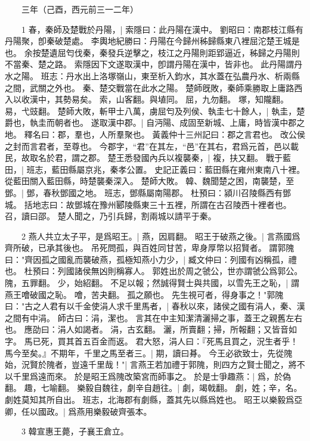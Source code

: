 　　三年（己酉，西元前三一二年）

　　1 春，秦師及楚戰於丹陽，|{
	索隱曰：此丹陽在漢中。
	劉昭曰：南郡枝江縣有丹陽聚，卽秦破楚處。
	李輿地紀勝曰：丹陽在今歸州秭歸縣東八裡屈沱楚王城是也。
	余按楚遺屈匄伐秦，秦發兵逆擊之，枝江之丹陽則距郢逼近，秭歸之丹陽則不當秦、楚之路。
	索隱因下文遂取漢中，卽謂丹陽在漢中，皆非也。
	此丹陽謂丹水之陽。
	班志：丹水出上洛塚嶺山，東至析入鈞水，其水蓋在弘農丹水、析兩縣之間，武關之外也。
	秦、楚交戰當在此水之陽。
	楚師旣敗，秦師乘勝取上庸路西入以收漢中，其勢易矣。
	索，山客翻。與埴同。
	屈，九勿翻。
	塚，知隴翻。
	易，弋豉翻。
}
楚師大敗，斬甲士八萬，虜屈匄及列侯、執圭七十餘人，|{
	執圭，楚爵也，執圭而朝者也。
}
遂取漢中郡。|{
	自沔陽、成固至新城、上庸，時皆漢中郡之地。
	釋名曰：郡，羣也，人所羣聚也。
	黃義仲十三州記曰：郡之言君也。
	改公侯之封而言君者，至尊也。
	今郡字，“君”在其左，“邑”在其右，君爲元首，邑以載民，故取名於君，謂之郡。
}
楚王悉發國內兵以複襲秦，|{
	複，扶又翻。
}
戰于藍田，|{
	班志，藍田縣屬京兆，秦孝公置。
	史記正義曰：藍田縣在雍州東南八十裡。
	從藍田關入藍田縣，時楚襲秦深入。
}
楚師大敗。
	韓、魏聞楚之困，南襲楚，至鄧。|{
	鄧，春秋鄧國之地。
	班志，鄧縣屬南陽郡。
	杜預曰：潁川召陵縣西有鄧城。
	括地志曰：故鄧城在豫州郾陵縣東三十五裡，所謂在古召陵西十裡者也。
	召，讀曰邵。
}
楚人聞之，乃引兵歸，割兩城以請平于秦。


　　2 燕人共立太子平，是爲昭王。|{
	燕，因肩翻。
}
昭王于破燕之後。|{
	言燕國爲齊所破，已承其後也。
}
吊死問孤，與百姓同甘苦，卑身厚幣以招賢者。
	謂郭隗曰："齊因孤之國亂而襲破燕，孤極知燕小力少，|{
	臧文仲曰：列國有凶稱孤，禮也。
	杜預曰：列國諸侯無凶則稱寡人。
	郭姓出於周之虢公，世亦謂虢公爲郭公。
	隗，五罪翻。
	少，始紹翻。
}
不足以報；然誠得賢士與共國，以雪先王之恥，|{
	謂燕王噲破國之恥。
	噲，苦夬翻。
}
孤之願也。
	先生視可者，得身事之！"郭隗曰："古之人君有以千金使涓人求千里馬者，|{
	春秋以來，諸侯之國有涓人，秦、漢之間有中涓。
	師古曰：涓，潔也。
	言其在中主知潔清灑掃之事，蓋王之親舊左右也。
	應劭曰：涓人如謁者。
	涓，古玄翻。
	灑，所賣翻；掃，所報翻；又皆音如字。
}
馬已死，買其首五百金而返。
	君大怒，涓人曰：『死馬且買之，況生者乎！馬今至矣。』不期年，千里之馬至者三。|{
	期，讀曰朞。
}
今王必欲致士，先從隗始，況賢於隗者，豈遠千里哉！"|{
	言燕王若加禮于郭隗，則四方之賢士聞之，將不以千里爲遠而來。
}
於是昭王爲隗改築宮而師事之。
	於是士爭趣燕：|{
	爲，於偽翻。
	趣，七喻翻。
}
樂毅自魏往，劇辛自趙往。|{
	劇，竭戟翻。
	劇，姓；辛，名。
	劇姓莫知其所自出。
	班志，北海郡有劇縣，蓋其先以縣爲姓也。
}
昭王以樂毅爲亞卿，任以國政。|{
	爲燕用樂毅破齊張本。
}

　　3 韓宣惠王薨，子襄王倉立。


